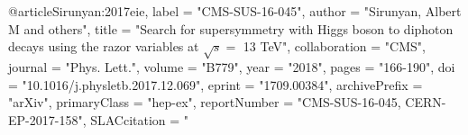 @article{Sirunyan:2017eie,
      label          = "CMS-SUS-16-045",
      author         = "Sirunyan, Albert M and others",
      title          = "{Search for supersymmetry with Higgs boson to diphoton
                        decays using the razor variables at $\sqrt{s} = $ 13 TeV}",
      collaboration  = "CMS",
      journal        = "Phys. Lett.",
      volume         = "B779",
      year           = "2018",
      pages          = "166-190",
      doi            = "10.1016/j.physletb.2017.12.069",
      eprint         = "1709.00384",
      archivePrefix  = "arXiv",
      primaryClass   = "hep-ex",
      reportNumber   = "CMS-SUS-16-045, CERN-EP-2017-158",
      SLACcitation   = "%
}

